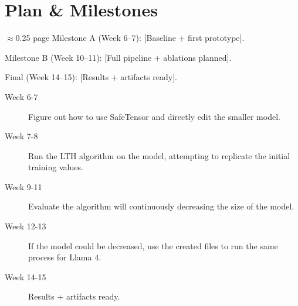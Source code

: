 \documentclass[
	title={Project Proposal}
]{cs595project}
\begin{document}
\section{Plan \& Milestones}\label{sec:plan-&-milestones}
\ifdetails
$\approx$0.25 page
Milestone A (Week 6–7): [Baseline + first prototype].

Milestone B (Week 10–11): [Full pipeline + ablations planned].

Final (Week 14–15): [Results + artifacts ready].
\fi
\begin{description}
	\item[Week 6-7] Figure out how to use SafeTensor and directly edit the smaller model.
	\item[Week 7-8] Run the LTH algorithm on the model, attempting to replicate the initial training values.
	\item[Week 9-11] Evaluate the algorithm will continuously decreasing the size of the model.
	\item[Week 12-13] If the model could be decreased, use the created files to run the same process for Llama 4.
	\item[Week 14-15] Results + artifacts ready.
\end{description}

\printbibliography[title={References}, heading=subbibnumbered]
\end{document}
